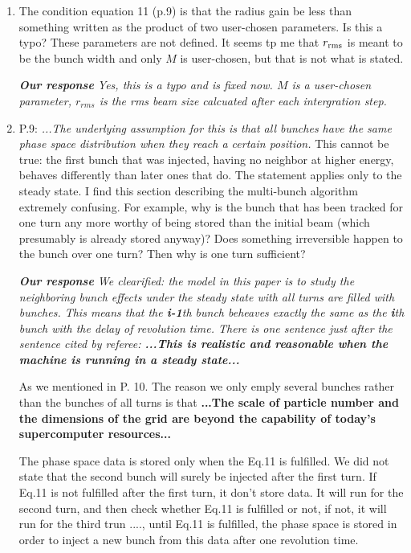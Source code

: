 \documentclass[10pt]{report}
\begin{document}
\begin{enumerate}
\vspace{+2mm} 

  \item The condition equation 11 (p.9) is that the radius gain be less than
 something 
 written as the 
 product of two user-chosen parameters. Is this a typo? These parameters are not
 defined. It seems tp me that $r_{\rm rms}$ is meant to be the bunch width and
 only $M$ is user-chosen, but that is not what is stated.
 
  \vspace{+2mm}
 {\it {\bf Our response} Yes, this is a typo and is fixed now. $M$ is a user-chosen parameter, $r_{rms}$ is the rms beam size calcuated after each intergration step.   
 }
 \vspace{+2mm}

 \item P.9: \textit{...The underlying assumption for this is that all bunches
 have the same phase space distribution when they reach a certain position.}
 This cannot be true: the first bunch that was injected, having no neighbor at
 higher energy, behaves differently than later ones that do. The statement
 applies only to the steady state. I find this section describing the
 multi-bunch algorithm extremely confusing. For example, why is the bunch that
 has been tracked for one turn any more worthy of being stored than the initial
 beam (which presumably is already stored anyway)? Does something irreversible
 happen to the bunch over one turn? Then why is one turn sufficient?
 
  \vspace{+2mm}
 {\it {\bf Our response} We clearified: the model in this paper is to study the neighboring bunch effects under the steady state with all turns are filled with bunches. 
   This means that the  {\bf i-1}th bunch beheaves exactly the same as the {\bf i}th bunch with the delay of revolution time. 
   There is one sentence just after the sentence cited by referee: 
   {\bf ...This is realistic and reasonable when the machine is running in a steady state...}

   As we mentioned in P. 10.  The reason we only emply several bunches rather than the bunches of all turns is that 
   {\bf ...The scale of particle number and the dimensions of the grid are beyond the capability of today's supercomputer resources...}

   The phase space data is stored only when the Eq.11 is fulfilled.
   We did not state that the second bunch will surely be injected after the first turn. 
   If Eq.11 is not fulfilled after the first turn, it don't store data. It will run for the second turn, and then check whether Eq.11 is fulfilled or not, if not, it will run for 
   the third trun ...., until Eq.11 is fulfilled, the phase space is stored in order to inject a new bunch from this data after one revolution time.
 }
 \vspace{+2mm}
 

\end{enumerate}
\end{document}
